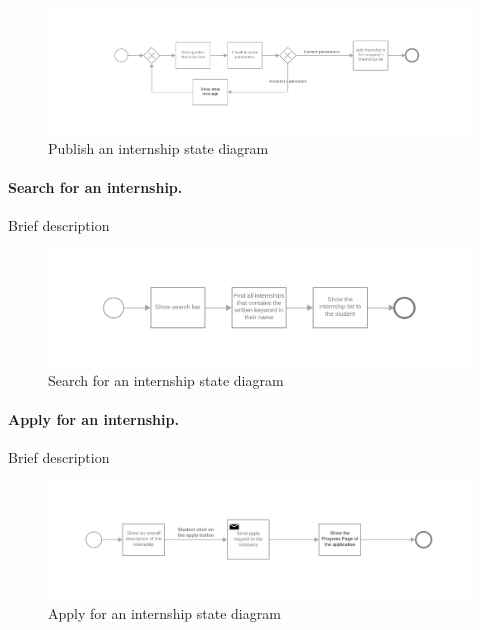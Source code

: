 \begin{figure}[H]
    \begin{center}
        \includegraphics[width=1\linewidth]{RASD/LaTeX/Images/StateDiagrams/publish_an_internship.png}
        \caption{Publish an internship state diagram}
        \label{fig:publish_an_internship_sd}%
    \end{center}
\end{figure}

\paragraph{Search for an internship.}
Brief description

\begin{figure}[H]
    \begin{center}
        \includegraphics[width=1\linewidth]{RASD/LaTeX/Images/StateDiagrams/search_for_an_internship.png}
        \caption{Search for an internship state diagram}
        \label{fig:search_for_an_internship_sd}%
    \end{center}
\end{figure}

\paragraph{Apply for an internship.}
Brief description

\begin{figure}[H]
    \begin{center}
        \includegraphics[width=1\linewidth]{RASD/LaTeX/Images/StateDiagrams/apply_for_an_internship.png}
        \caption{Apply for an internship state diagram}
        \label{fig:apply_for_an_internship_sd}%
    \end{center}
\end{figure}


